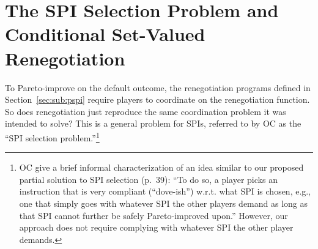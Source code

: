 \documentclass[sigconf]{aamas}
\theoremstyle{definition}
\begin{document}
\section{The SPI Selection Problem and Conditional Set-Valued Renegotiation}
\label{sec:sub:selection}

To Pareto-improve on the default outcome, 
the renegotiation
programs defined
in Section~\ref{sec:sub:pspi}
require players to coordinate on the renegotiation
function.
So does renegotiation just reproduce the same coordination
problem it was intended to solve? 
This is a general problem for SPIs, 
referred to by OC
as the ``SPI selection problem.''\footnote{OC give a brief informal
characterization of an
idea similar to our proposed partial
solution to SPI selection (p.\ 39): ``To do so, a player
picks an instruction that is very compliant (“dove-ish”) w.r.t. what SPI is
chosen, e.g., one that simply goes with whatever SPI the other players demand as long as that SPI cannot further be safely Pareto-improved upon.''
However, our approach does not require
complying with whatever SPI the other player demands.}
\end{document}
